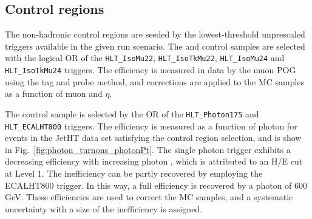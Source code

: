 
\subsection{Control regions\label{sec:control_samples}}




The non-hadronic control regions are seeded by the lowest-threshold unprescaled 
triggers available in the given run scenario. The 
\mj and \mmj control samples are selected with the logical OR of the \verb!HLT_IsoMu22!, 
\verb!HLT_IsoTkMu22!, \verb!HLT_IsoMu24! and \verb!HLT_IsoTkMu24! triggers.
The efficiency is measured in data by the muon POG using the tag and probe method,
and corrections are applied to the MC samples as a function of muon \Pt and $\eta$.

The \gj control sample is selected by the OR of the \verb!HLT_Photon175! and
\verb!HLT_ECALHT800! triggers. The efficiency is measured as a function of photon
\Pt %
for events in the JetHT data set satisfying the \gj control region selection,
and is show in Fig.~\ref{fig:photon_turnons_photonPt}.%
The single photon trigger exhibits a decreasing efficiency
with increasing photon \Pt, which is attributed to an H/E cut at Level 1. The inefficiency
can be partly recovered by employing the ECALHT800 trigger. In this way, a full efficiency
is recovered by a photon \Pt of 600 GeV.%
These efficiencies are used
to correct the MC samples, and a systematic uncertainty with a size of the 
inefficiency is assigned.

